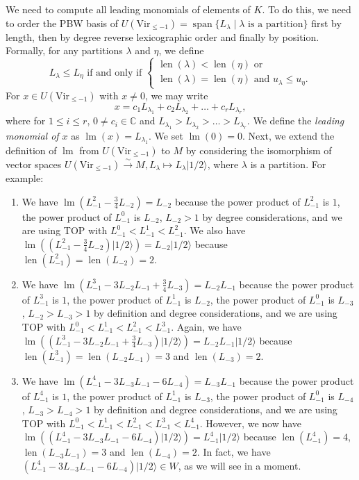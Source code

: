 \documentclass[a4paper, 12pt, reqno]{amsart}
\theoremstyle{remark}
\DeclareMathOperator{\lm}{lm}
\DeclareMathOperator{\vspan}{span}
\DeclareMathOperator{\len}{len}
\newcommand{\vachalf}{{|1/2\rangle}}
\newcommand{\Vir}{{\mathrm{Vir}}}
\begin{document}
We need to compute all leading monomials of elements of $K$.
To do this, we need to order the PBW basis of $U(\Vir_{\le -1}) = \vspan\{L_{\lambda} \mid \text{$\lambda$ is a partition}\}$ first by length, then by degree reverse lexicographic order and finally by position.
Formally, for any partitions $\lambda$ and $\eta$, we define
\begin{equation*}
  L_{\lambda} \le L_{\eta}\text{ if and only if }
  \begin{cases}
    \len(\lambda) < \len(\eta)\text{ or } \\
    \len(\lambda) = \len(\eta)\text{ and }u_{\lambda} \le u_{\eta}.
  \end{cases}
\end{equation*}
For $x \in U(\Vir_{\le -1})$ with $x \neq 0$, we may write
\begin{equation*}
  x = c_1L_{\lambda_1} + c_2L_{\lambda_2} + \dots + c_rL_{\lambda_r},
\end{equation*}
where for $1 \le i \le r$, $0 \neq c_i \in \mathbb{C}$ and $L_{\lambda_1} > L_{\lambda_2} > \dots > L_{\lambda_r}$.
We define the \emph{leading monomial of $x$} as $\lm(x) = L_{\lambda_1}$.
We set $\lm(0) = 0$.
Next, we extend the definition of $\lm$ from $U(\Vir_{\le -1})$ to $M$ by considering the isomorphism of vector spaces $U(\Vir_{\le -1}) \xrightarrow{\sim} M, L_{\lambda} \mapsto L_{\lambda}\vachalf$, where $\lambda$ is a partition.
For example:
\begin{enumerate}
\item We have $\lm(L_{-1}^2 - \frac{3}{4}L_{-2}) = L_{-2}$ because the power product of $L_{-1}^2$ is $1$, the power product of $L_{-1}^0$ is $L_{-2}$, $L_{-2} > 1$ by degree considerations, and we are using TOP with $L_{-1}^0 < L_{-1}^1 < L_{-1}^2$.
  We also have $\lm((L_{-1}^2 - \frac{3}{4}L_{-2})\vachalf) = L_{-2}\vachalf$ because $\len(L_{-1}^2) = \len(L_{-2}) = 2$.
\item We have $\lm(L_{-1}^3 - 3L_{-2}L_{-1} + \frac{3}{4}L_{-3}) = L_{-2}L_{-1}$ because the power product of $L_{-1}^3$ is $1$, the power product of $L_{-1}^1$ is $L_{-2}$, the power product of $L_{-1}^0$ is $L_{-3}$, $L_{-2} > L_{-3} > 1$ by definition and degree considerations, and we are using TOP with $L_{-1}^0 < L_{-1}^1 < L_{-1}^2 < L_{-1}^3$.
  Again, we have $\lm((L_{-1}^3 - 3L_{-2}L_{-1} + \frac{3}{4}L_{-3})\vachalf) = L_{-2}L_{-1}\vachalf$ because $\len(L_{-1}^3) = \len(L_{-2}L_{-1}) = 3$ and $\len(L_{-3}) = 2$.
\item We have $\lm(L_{-1}^4 - 3L_{-3}L_{-1} - 6L_{-4}) = L_{-3}L_{-1}$ because the power product of $L_{-1}^4$ is $1$, the power product of $L_{-1}^1$ is $L_{-3}$, the power product of $L_{-1}^0$ is $L_{-4}$, $L_{-3} > L_{-4} > 1$ by definition and degree considerations, and we are using TOP with $L_{-1}^0 < L_{-1}^1 < L_{-1}^2 < L_{-1}^3 < L_{-1}^4$.
  However, we now have $\lm((L_{-1}^4 - 3L_{-3}L_{-1} - 6L_{-4})\vachalf) = L_{-1}^4\vachalf$ because $\len(L_{-1}^4) = 4$, $\len(L_{-3}L_{-1}) = 3$ and $\len(L_{-4}) = 2$.
  In fact, we have $(L_{-1}^4 - 3L_{-3}L_{-1} - 6L_{-4})\vachalf \in W$, as we will see in a moment.
\end{enumerate}
\end{document}
